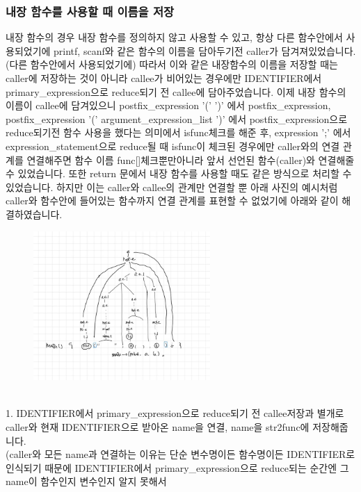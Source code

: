 \documentclass{article}
\begin{document}
            \subsubsection{내장 함수를 사용할 때 이름을 저장}
                내장 함수의 경우 내장 함수를 정의하지 않고 사용할 수 있고, 항상 다른 함수안에서 사용되었기에 printf, scanf와 같은 함수의 이름을 담아두기전 caller가 담겨져있었습니다. (다른 함수안에서 사용되었기에) 
				따라서 이와 같은 내장함수의 이름을 저장할 때는 caller에 저장하는 것이 아니라 callee가 비어있는 경우에만 IDENTIFIER에서 primary\_expression으로 reduce되기 전 callee에 담아주었습니다.
				이제 내장 함수의 이름이 callee에 담겨있으니 postfix\_expression '(' ')' 에서  postfix\_expression, postfix\_expression '(' argument\_expression\_list ')' 에서 postfix\_expression으로
				reduce되기전 함수 사용을 했다는 의미에서 isfunc체크를 해준 후, expression ';' 에서 expression\_statement으로 reduce될 때 isfunc이 체크된 경우에만 caller와의 연결 관계를 연결해주면 함수 이름 
				func[]체크뿐만아니라 앞서 선언된 함수(caller)와 연결해줄 수 있었습니다. 또한 return 문에서 내장 함수를 사용할 때도 같은 방식으로 처리할 수 있었습니다. 하지만 이는 caller와 callee의 관계만 연결할 뿐 
                아래 사진의 예시처럼 caller와 함수안에 들어있는 함수까지 연결 관계를 표현할 수 없었기에 아래와 같이 해결하였습니다. \\  
				\begin{figure}[h]
					\includegraphics[width = 0.6\textwidth]{func.jpg}
				\end{figure}
				\\1. IDENTIFIER에서 primary\_expression으로 reduce되기 전 callee저장과 별개로 caller와 현재 IDENTIFIER으로 받아온 name을 연결, name을 str2func에 저장해줍니다. 
				\\	 (caller와 모든 name과 연결하는 이유는 단순 변수명이든 함수명이든 IDENTIFIER로 인식되기 때문에 IDENTIFIER에서 primary\_expression으로 reduce되는 순간엔 그 name이 함수인지 변수인지 알지 못해서
\end{document}
